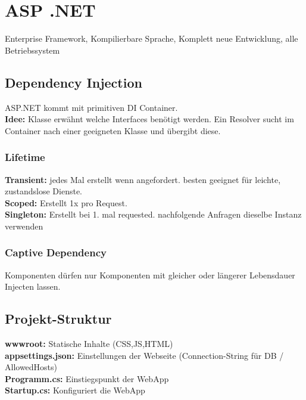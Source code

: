 


\section{ASP .NET}
Enterprise Framework, Kompilierbare Sprache, Komplett neue Entwicklung, alle Betriebssystem

\subsection{Dependency Injection}
ASP.NET kommt mit primitiven DI Container.\\
\textbf{Idee:} Klasse erwähnt welche Interfaces benötigt werden. Ein Resolver sucht im Container nach einer geeigneten Klasse und übergibt diese.

\subsubsection{Lifetime}
\textbf{Transient:} jedes Mal erstellt wenn angefordert. besten geeignet für leichte, zustandslose Dienste.\\
\textbf{Scoped:} Erstellt 1x pro Request.\\
\textbf{Singleton:} Erstellt bei 1. mal requested. nachfolgende Anfragen dieselbe Instanz verwenden

\subsubsection{Captive Dependency}
Komponenten dürfen nur Komponenten mit gleicher oder längerer Lebensdauer Injecten lassen.

\subsection{Projekt-Struktur}
\textbf{wwwroot:} Statische Inhalte (CSS,JS,HTML)\\
\textbf{appsettings.json:} Einstellungen der Webseite (Connection-String für DB / AllowedHosts)\\
\textbf{Programm.cs:} Einstiegspunkt der WebApp\\
\textbf{Startup.cs:} Konfiguriert die WebApp

